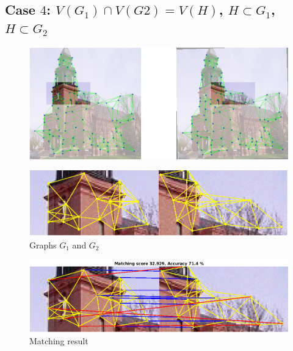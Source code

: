 \documentclass[
	fontsize=12pt,
	paper=a4,
	twoside=false,
	numbers=noenddot,
	plainheadsepline,
	toc=listof,
	toc=bibliography
]{scrartcl}
\begin{document}
\subsection*{ Case $4$: $V(G_1)\cap V(G2) = V(H)$, $H\subset G_1$, $H\subset G_2$}
\begin{figure} [htb] \centering
	\includegraphics[scale = 0.35]{test4/subregions.png}
\end{figure}
\begin{figure} [hb] \centering
	\includegraphics[scale = 0.4]{test4/subgraphs.png}
	\caption{Graphs $G_1$ and $G_2$}
\end{figure}
\begin{figure} [htb] \centering
	\includegraphics[scale = 0.4]{test4/matching_result.png}
	\caption{ Matching result}
\end{figure}

\FloatBarrier
\newpage
\end{document}
